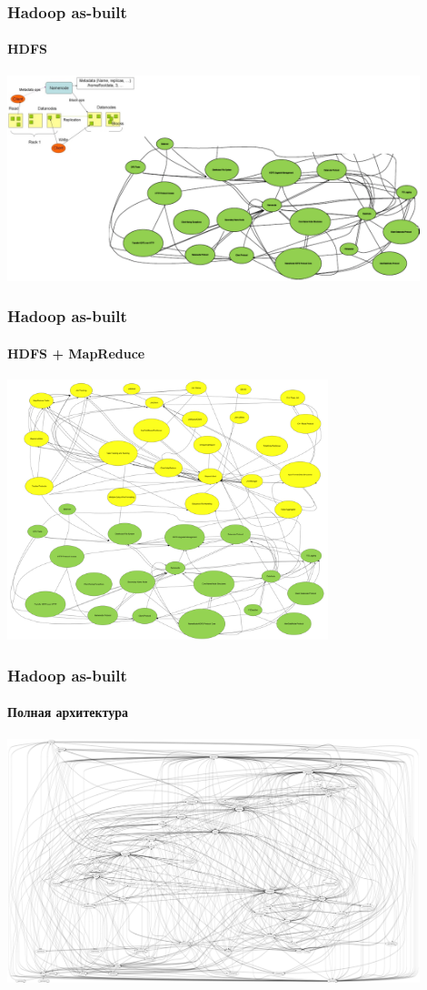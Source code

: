 \documentclass[xetex,mathserif,serif]{beamer}
\begin{document}
	\begin{frame}
		\frametitle{Hadoop as-built}
		\framesubtitle{HDFS}
		\begin{center}
			\includegraphics[width=0.9\textwidth]{hadoopDescriptive.png}
		\end{center}
	\end{frame}

	\begin{frame}
		\frametitle{Hadoop as-built}
		\framesubtitle{HDFS + MapReduce}
		\begin{center}
			\includegraphics[width=0.7\textwidth]{hdfsMapReduce.png}
		\end{center}
	\end{frame}

	\begin{frame}
		\frametitle{Hadoop as-built}
		\framesubtitle{Полная архитектура}
		\begin{center}
			\includegraphics[width=0.9\textwidth]{hadoopFull.png}
		\end{center}
	\end{frame}
\end{document}
